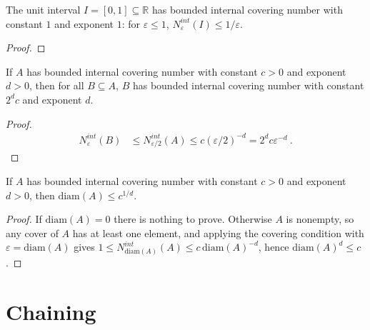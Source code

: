 \begin{lemma}\label{lem:hasBoundedInternalCoveringNumber_unitInterval}
  \leanok
The unit interval $I = [0, 1] \subseteq \mathbb{R}$ has bounded internal covering number with constant $1$ and exponent $1$: for $\varepsilon \le 1$, $N^{int}_\varepsilon(I) \le 1/\varepsilon$.
\end{lemma}

\begin{proof}\leanok

\end{proof}


\begin{lemma}\label{lem:hasBoundedInternalCoveringNumber_subset}
  \leanok
If $A$ has bounded internal covering number with constant $c>0$ and exponent $d>0$, then for all $B \subseteq A$, $B$ has bounded internal covering number with constant $2^d c$ and exponent $d$.
\end{lemma}

\begin{proof}\leanok
\begin{align*}
  N^{int}_\varepsilon(B)
  &\le N^{int}_{\varepsilon/2}(A)
  \le c (\varepsilon/2)^{-d}
  = 2^d c \varepsilon^{-d}
  \: .
\end{align*}
\end{proof}


\begin{lemma}\label{lem:hasBoundedInternalCoveringNumber_diam_le}
  \leanok
If $A$ has bounded internal covering number with constant $c>0$ and exponent $d>0$, then $\mathrm{diam}(A) \le c^{1/d}$.
\end{lemma}

\begin{proof}\leanok
If $\mathrm{diam}(A) = 0$ there is nothing to prove.
Otherwise $A$ is nonempty, so any cover of $A$ has at least one element, and applying the covering condition with $\varepsilon = \mathrm{diam}(A)$ gives
$1 \le N^{int}_{\mathrm{diam}(A)}(A) \le c \, \mathrm{diam}(A)^{-d}$, hence $\mathrm{diam}(A)^d \le c$.
\end{proof}


\section{Chaining}


